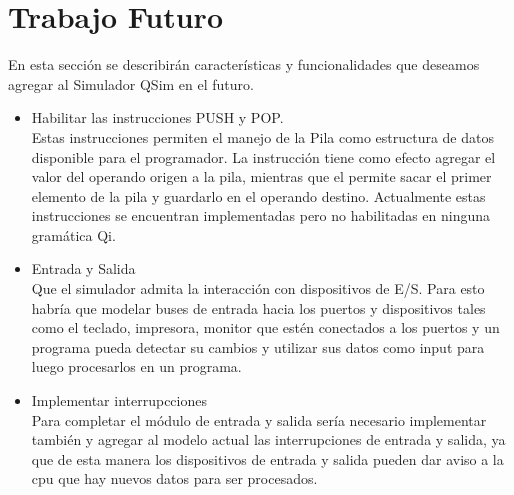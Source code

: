 

\section{Trabajo Futuro}

En esta sección se describirán características y funcionalidades que deseamos agregar al Simulador QSim en el futuro.

\begin{itemize}

\item Habilitar las instrucciones PUSH y POP.\\

Estas instrucciones permiten el manejo de la Pila como estructura de datos disponible para el programador. La instrucción  tiene como efecto agregar el valor del operando origen a la pila, mientras que el  permite sacar el primer elemento de la pila y guardarlo en el operando destino. Actualmente estas instrucciones se encuentran implementadas pero no habilitadas en ninguna gramática Qi.

\item Entrada y Salida\\

Que el simulador admita la interacción con dispositivos de E/S. Para esto habría que modelar buses de entrada hacia los puertos y dispositivos tales como el teclado, impresora, monitor que estén conectados a los puertos y un programa pueda detectar su cambios y utilizar sus datos como input para luego procesarlos en un programa.

\item Implementar interrupcciones\\

Para completar el módulo de entrada y salida sería necesario implementar también y agregar al modelo actual las interrupciones de entrada y salida, ya que de esta manera los dispositivos de entrada y salida pueden dar aviso a la cpu que hay nuevos datos para ser procesados.

\end{itemize}

